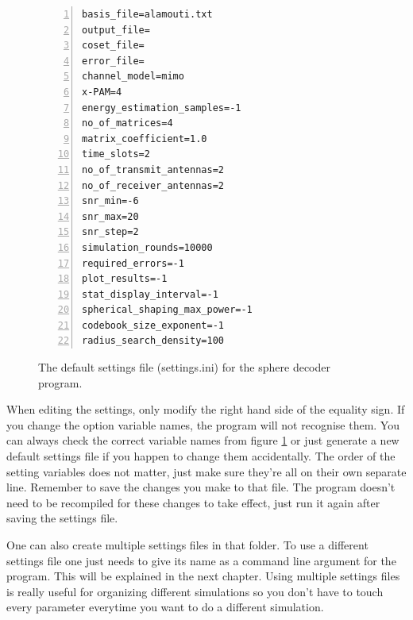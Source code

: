 \documentclass[english,12pt,a4paper,pdftex,sci,utf8]{aaltothesis}
\begin{document}

\begin{figure}[htb]
\begin{Verbatim}[frame=single, numbers=left]
basis_file=alamouti.txt
output_file=
coset_file=
error_file= 
channel_model=mimo            
x-PAM=4                         
energy_estimation_samples=-1   
no_of_matrices=4                
matrix_coefficient=1.0         
time_slots=2                    
no_of_transmit_antennas=2      
no_of_receiver_antennas=2    
snr_min=-6                      
snr_max=20                    
snr_step=2                    
simulation_rounds=10000       
required_errors=-1              
plot_results=-1    
stat_display_interval=-1        
spherical_shaping_max_power=-1
codebook_size_exponent=-1     
radius_search_density=100
\end{Verbatim}
\caption{The default settings file (settings.ini) for the sphere decoder program.}
\label{fig:settings}
\end{figure}

When editing the settings, only modify the right hand side of the equality sign. If you change the option variable names, the program will not recognise them. You can always check the correct variable names from figure \ref{fig:settings} or just generate a new default settings file if you happen to change them accidentally. 
The order of the setting variables does not matter, just make sure they're all on their own separate line. Remember to save the changes you make to that file. The program doesn't need to be recompiled for these changes to take effect, just run it again after saving the settings file.
\par One can also create multiple settings files in that folder. To use a different settings file one just needs to give its name as a command line argument for the program. This will be explained in the next chapter. Using multiple settings files is really useful for organizing different simulations so you don't have to touch every parameter everytime you want to do a different simulation.
\end{document}
